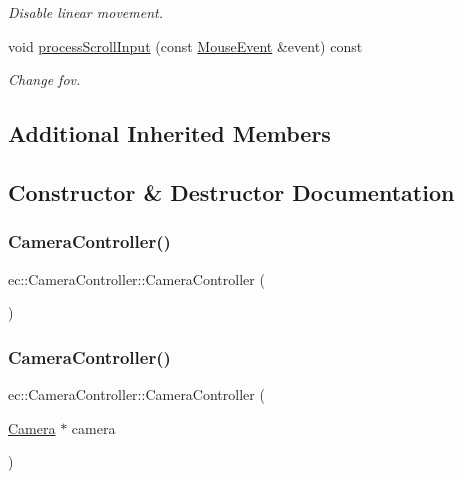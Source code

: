 \begin{DoxyCompactItemize}
\begin{DoxyCompactList}\small\item\em Disable linear movement. \end{DoxyCompactList}\item 
void \mbox{\hyperlink{classec_1_1_camera_controller_aa2f60cde89ba3e982eef28d505927c22}{process\+Scroll\+Input}} (const \mbox{\hyperlink{structec_1_1_mouse_event}{Mouse\+Event}} \&event) const
\begin{DoxyCompactList}\small\item\em Change fov. \end{DoxyCompactList}\end{DoxyCompactItemize}
\subsection*{Additional Inherited Members}


\subsection{Constructor \& Destructor Documentation}
\mbox{\label{classec_1_1_camera_controller_a53fd061c49374fd8f1194cecac1e35aa}} 
\subsubsection{\texorpdfstring{Camera\+Controller()}{CameraController()}\hspace{0.1cm}{\footnotesize\ttfamily [1/2]}}
{\footnotesize\ttfamily ec\+::\+Camera\+Controller\+::\+Camera\+Controller (\begin{DoxyParamCaption}{ }\end{DoxyParamCaption})\hspace{0.3cm}{\ttfamily [explicit]}}

\mbox{\label{classec_1_1_camera_controller_a9edd8fff13533c84c7ea8f7f10f16580}} 
\subsubsection{\texorpdfstring{Camera\+Controller()}{CameraController()}\hspace{0.1cm}{\footnotesize\ttfamily [2/2]}}
{\footnotesize\ttfamily ec\+::\+Camera\+Controller\+::\+Camera\+Controller (\begin{DoxyParamCaption}\item[{\mbox{\hyperlink{classec_1_1_camera}{Camera}} $\ast$}]{camera }\end{DoxyParamCaption})\hspace{0.3cm}{\ttfamily [explicit]}}


